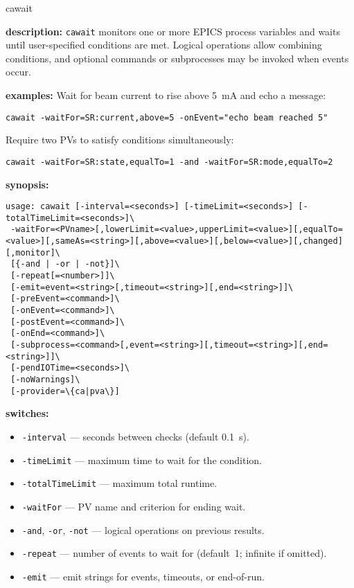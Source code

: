 \begin{sddsprog}{cawait}
\item \textbf{description:}
\verb+cawait+ monitors one or more EPICS process variables and waits until
user-specified conditions are met. Logical operations allow combining
conditions, and optional commands or subprocesses may be invoked when
events occur.
\item \textbf{examples:}
Wait for beam current to rise above 5~mA and echo a message:
\begin{verbatim}
cawait -waitFor=SR:current,above=5 -onEvent="echo beam reached 5"
\end{verbatim}
Require two PVs to satisfy conditions simultaneously:
\begin{verbatim}
cawait -waitFor=SR:state,equalTo=1 -and -waitFor=SR:mode,equalTo=2
\end{verbatim}
\item \textbf{synopsis:}
\begin{verbatim}
usage: cawait [-interval=<seconds>] [-timeLimit=<seconds>] [-totalTimeLimit=<seconds>]\
 -waitFor=<PVname>[,lowerLimit=<value>,upperLimit=<value>][,equalTo=<value>][,sameAs=<string>][,above=<value>][,below=<value>][,changed][,monitor]\
 [{-and | -or | -not}]\
 [-repeat[=<number>]]\
 [-emit=event=<string>[,timeout=<string>][,end=<string>]]\
 [-preEvent=<command>]\
 [-onEvent=<command>]\
 [-postEvent=<command>]\
 [-onEnd=<command>]\
 [-subprocess=<command>[,event=<string>][,timeout=<string>][,end=<string>]]\
 [-pendIOTime=<seconds>]\
 [-noWarnings]\
 [-provider=\{ca|pva\}]
\end{verbatim}
\item \textbf{switches:}
\begin{itemize}
  \item {\tt -interval} --- seconds between checks (default 0.1~s).
  \item {\tt -timeLimit} --- maximum time to wait for the condition.
  \item {\tt -totalTimeLimit} --- maximum total runtime.
  \item {\tt -waitFor} --- PV name and criterion for ending wait.
  \item {\tt -and}, {\tt -or}, {\tt -not} --- logical operations on previous results.
  \item {\tt -repeat} --- number of events to wait for (default~1; infinite if omitted).
  \item {\tt -emit} --- emit strings for events, timeouts, or end-of-run.

\end{itemize}
\end{sddsprog}
